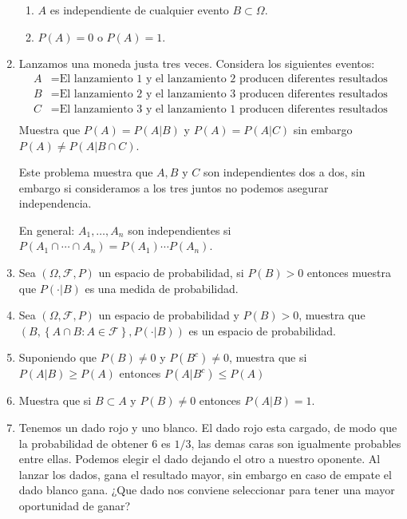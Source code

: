\documentclass{report}
\begin{document}
\begin{enumerate}
\begin{enumerate}
        \item $A$ es independiente de cualquier evento $B\subset \Omega$.
        \item $P(A)=0$ o $P(A)=1$. 
    \end{enumerate}
    \item Lanzamos una moneda justa tres veces. Considera los siguientes eventos:
    \begin{align*}
        A & = \text{El lanzamiento 1 y el lanzamiento 2 producen diferentes resultados}\\
        B & = \text{El lanzamiento 2 y el lanzamiento 3 producen diferentes resultados}\\
        C & = \text{El lanzamiento 3 y el lanzamiento 1 producen diferentes resultados}\\
    \end{align*}
    Muestra que $P(A)=P(A\vert B)$ y $P(A)=P(A\vert C)$ sin embargo $P(A)\neq P(A\vert B\cap C)$.

    Este problema muestra que $A, B$ y $C$ son independientes dos a dos, sin embargo si consideramos a los tres juntos no podemos asegurar independencia.

    En general:  $A_1,\ldots, A_n$ son independientes si $P(A_1\cap\cdots\cap A_n)=P(A_1)\cdots P(A_n)$.
    \item Sea $(\Omega, \mathcal{F}, P)$ un espacio de probabilidad, si $P(B) >0$ entonces muestra que $P(\cdot\vert B)$ es una medida de probabilidad.
    \item Sea $(\Omega, \mathcal{F}, P)$ un espacio de probabilidad y $P(B)>0$, muestra que $(B, \left\{A\cap B : A\in \mathcal{F}\right\}, P(\cdot\vert B))$ es un espacio de probabilidad.
    \item Suponiendo que $P(B)\neq 0$ y $P(B^c)\neq 0$, muestra que si $P(A\vert B) \geq P(A)$ entonces $P(A\vert B^c) \leq P(A)$
    \item Muestra que si $B\subset A$ y $P(B)\neq 0$ entonces $P(A\vert B) = 1$.
    \item Tenemos un dado rojo y uno blanco. El dado rojo esta cargado, de modo que la probabilidad de obtener 6 es $1/3$, las demas caras son igualmente probables entre ellas. Podemos elegir el dado dejando el otro a nuestro oponente. Al lanzar los dados, gana el resultado mayor, sin embargo en caso de empate el dado blanco gana. ¿Que dado nos conviene seleccionar para tener una mayor oportunidad de ganar? 
\end{enumerate} 
\end{document}
